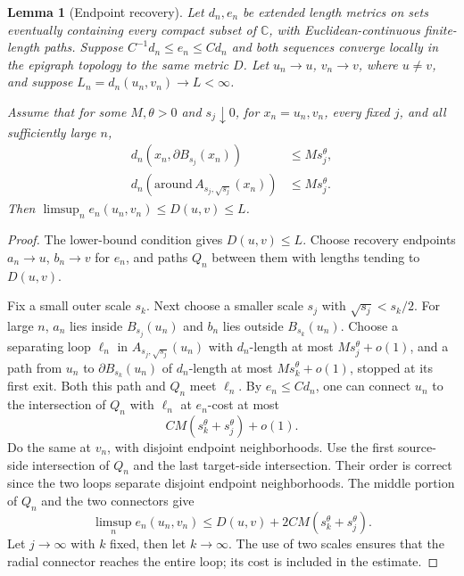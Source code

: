 \documentclass[11pt]{article}
\newtheorem{lemma}[theorem]{Lemma}
\theoremstyle{definition}
\theoremstyle{remark}
\newcommand{\C}{\mathbb C}
\begin{document}
\begin{lemma}[Endpoint recovery]\label{lem:recovery}
Let $d_n,e_n$ be extended length metrics on sets eventually
containing every compact subset of $\C$, with Euclidean-continuous
finite-length paths. Suppose
$C^{-1}d_n\le e_n\le Cd_n$ and both sequences converge locally
in the epigraph topology to the same metric $D$. Let
$u_n\to u$, $v_n\to v$, where $u\ne v$, and suppose
$L_n=d_n(u_n,v_n)\to L<\infty$.

Assume that for some $M,\theta>0$ and $s_j\downarrow0$, for
$x_n=u_n,v_n$, every fixed $j$, and all sufficiently large $n$,
\begin{equation}\label{eq:recovery-bounds}
 \begin{split}
 d_n(x_n,\partial B_{s_j}(x_n))&\le Ms_j^\theta,\\
 d_n(\mathrm{around}\,A_{s_j,\sqrt{s_j}}(x_n))
                                      &\le Ms_j^\theta.
 \end{split}
\end{equation}
Then $\limsup_n e_n(u_n,v_n)\le D(u,v)\le L$.
\end{lemma}
\begin{proof}
The lower-bound condition gives $D(u,v)\le L$. Choose recovery
endpoints $a_n\to u$, $b_n\to v$ for $e_n$, and paths $Q_n$
between them with lengths tending to $D(u,v)$.

Fix a small outer scale $s_k$. Next choose a smaller scale $s_j$
with $\sqrt{s_j}<s_k/2$. For large $n$, $a_n$ lies inside
$B_{s_j}(u_n)$ and $b_n$ lies outside $B_{s_k}(u_n)$.
Choose a separating loop $\ell_n$ in
$A_{s_j,\sqrt{s_j}}(u_n)$ with $d_n$-length at most
$Ms_j^\theta+o(1)$, and a path from $u_n$ to
$\partial B_{s_k}(u_n)$ of $d_n$-length at most
$Ms_k^\theta+o(1)$, stopped at its first exit. Both this path
and $Q_n$ meet $\ell_n$. By $e_n\le Cd_n$, one can connect
$u_n$ to the intersection of $Q_n$ with $\ell_n$ at $e_n$-cost
at most
\[
                    CM(s_k^\theta+s_j^\theta)+o(1).
\]
Do the same at $v_n$, with disjoint endpoint neighborhoods.
Use the first source-side intersection of $Q_n$ and the last
target-side intersection. Their order is correct since the two
loops separate disjoint endpoint neighborhoods. The middle
portion of $Q_n$ and the two connectors give
\[
 \limsup_n e_n(u_n,v_n)
       \le D(u,v)+2CM(s_k^\theta+s_j^\theta).
\]
Let $j\to\infty$ with $k$ fixed, then let $k\to\infty$.
The use of two scales ensures that the radial connector reaches
the entire loop; its cost is included in the estimate.
\end{proof}
\end{document}
